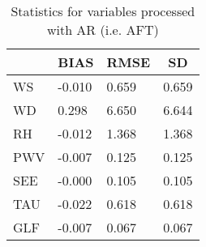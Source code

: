 \documentclass[11pt,english]{article}
\begin{document}
\begin{table}[]
\begin{center}
\begin{tabular}{|l|l|l|l|}
\hline
                            & \multicolumn{1}{c|}{\cellcolor[HTML]{C0C0C0}\textbf{BIAS}} & \multicolumn{1}{c|}{\cellcolor[HTML]{C0C0C0}\textbf{RMSE}} & \multicolumn{1}{c|}{\cellcolor[HTML]{C0C0C0}\textbf{SD}} \\\hline
\cellcolor[HTML]{C0C0C0}WS  &    -0.010                                &     0.659                                &     0.659                                \\
\cellcolor[HTML]{C0C0C0}WD  &     0.298                                &     6.650                                &     6.644                                \\
\cellcolor[HTML]{C0C0C0}RH  &    -0.012                                &     1.368                                &     1.368                                \\
\cellcolor[HTML]{C0C0C0}PWV &    -0.007                               &     0.125                               &     0.125                               \\
\cellcolor[HTML]{C0C0C0}SEE &    -0.000                               &     0.105                               &     0.105                               \\
\cellcolor[HTML]{C0C0C0}TAU &    -0.022                               &     0.618                               &     0.618                               \\
\cellcolor[HTML]{C0C0C0}GLF &    -0.007                               &     0.067                               &     0.067                               \\
\hline
\end{tabular}
\caption{Statistics for variables processed with AR (i.e. AFT)}
\end{center}
\end{table}
\clearpage
\end{document}
